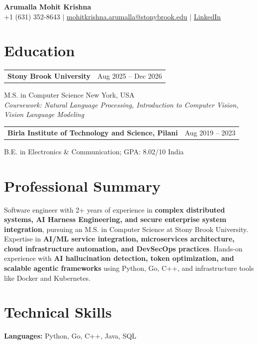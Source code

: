 \documentclass[letterpaper,10pt]{article}
\makeatletter
\newcommand{\entry}[2]{%
  \noindent
  \begin{tabularx}{\linewidth}
    {@{}>{\raggedright\arraybackslash}X@{\hspace{6pt}}r@{}}
    \textbf{#1} & #2
  \end{tabularx}\par
}
\makeatother
\begin{document}
\begin{center}
    {\LARGE\bfseries Arumalla Mohit Krishna}\\[3pt]
    +1 (631) 352-8643 $|$
    \href{mailto:mohitkrishna.arumalla@stonybrook.edu}
    {mohitkrishna.arumalla@stonybrook.edu} $|$
    \href{https://linkedin.com/in/mohit-krishna-arumalla}
    {LinkedIn}
\end{center}
\vspace{-8pt}

\section{Education}

\entry
  {\textbf{Stony Brook University}}
  {Aug 2025 -- Dec 2026}

M.S. in Computer Science \hfill New York, USA\\
\textit{
Coursework: Natural Language Processing,
Introduction to Computer Vision, Vision Language Modeling
}
\vspace{3pt}

\entry
  {\textbf{Birla Institute of Technology and Science, Pilani}}
  {Aug 2019 -- 2023}

B.E. in Electronics \& Communication; GPA: 8.02/10 \hfill India
\section{Professional Summary}

Software engineer with 2+ years of experience in \textbf{complex distributed systems, AI Harness Engineering, and secure enterprise system integration}, pursuing an M.S. in Computer Science at Stony Brook University. Expertise in \textbf{AI/ML service integration, microservices architecture, cloud infrastructure automation, and DevSecOps practices}. Hands-on experience with \textbf{AI hallucination detection, token optimization, and scalable agentic frameworks} using Python, Go, C++, and infrastructure tools like Docker and Kubernetes.

\section{Technical Skills}

\textbf{Languages:}
Python, Go, C++, Java, SQL\\
\end{document}
